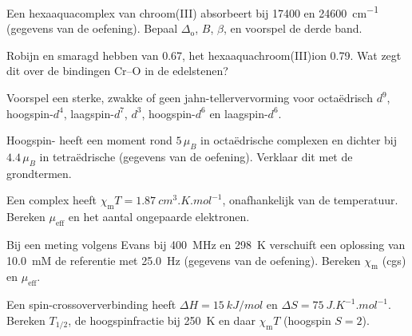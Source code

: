 \begin{exercise}[$\star\star$]\label{exo:b3:complex-spectra-magnetism:6}
Een hexaaquacomplex van chroom(III) absorbeert bij 17400 en \qty{24600}{cm^{-1}} (gegevens van de
oefening). Bepaal $\Delta_{\mathrm o}$, $B$, $\beta$, en voorspel de derde band.
\end{exercise}

\begin{exercise}[$\star\star$]\label{exo:b3:complex-spectra-magnetism:7}
Robijn en smaragd hebben  van 0.67, het
hexaaquachroom(III)ion
0.79. Wat zegt dit over de bindingen Cr--O in de edelstenen?
\end{exercise}

\begin{exercise}[$\star\star$]\label{exo:b3:complex-spectra-magnetism:8}
Voorspel een sterke, zwakke of geen jahn-tellervervorming voor octaëdrisch $d^9$, hoogspin-$d^4$,
laagspin-$d^7$, $d^3$, hoogspin-$d^6$ en laagspin-$d^6$.
\end{exercise}

\begin{exercise}[$\star\star$]\label{exo:b3:complex-spectra-magnetism:9}
Hoogspin- heeft een moment rond $5\,\mu_B$ in octaëdrische complexen en dichter bij
$4.4\,\mu_B$ in tetraëdrische (gegevens van de oefening). Verklaar dit met de
grondtermen.
\end{exercise}

\begin{exercise}[$\star\star\star$]\label{exo:b3:complex-spectra-magnetism:10}
Een complex heeft $\chi_{\mathrm m}T = \qty{1.87}{cm^3.K.mol^{-1}}$, onafhankelijk van de temperatuur. Bereken $\mu_{\mathrm{eff}}$ en
het aantal ongepaarde elektronen.
\end{exercise}

\begin{exercise}[$\star\star\star$]\label{exo:b3:complex-spectra-magnetism:11}
Bij een meting volgens Evans bij \qty{400}{MHz} en \qty{298}{K} verschuift een oplossing van \qty{10.0}{mM} de
referentie met \qty{25.0}{Hz} (gegevens van de oefening). Bereken $\chi_{\mathrm m}$ (cgs) en $\mu_{\mathrm{eff}}$.
\end{exercise}

\begin{exercise}[$\star\star\star$]\label{exo:b3:complex-spectra-magnetism:12}
Een spin-crossoververbinding heeft $\Delta H = \qty{15}{kJ/mol}$ en $\Delta S = \qty{75}{J.K^{-1}.mol^{-1}}$. Bereken $T_{1/2}$,
de hoogspinfractie bij \qty{250}{K} en daar $\chi_{\mathrm m}T$ (hoogspin $S = 2$).
\end{exercise}


